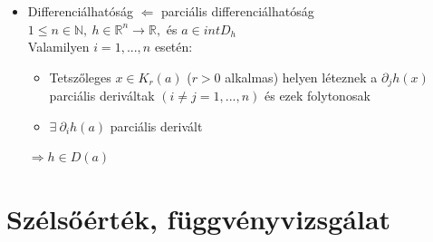 \documentclass[margin=0px]{article}
\newcommand{\R}{\mathbb{R}}
\begin{document}
\begin{description}
\begin{itemize}
						\item Differenciálhatóság $\Leftarrow$ parciális differenciálhatóság \\
							$ 1 \leq n \in \mathbb{N}, \ h \in \R^n \rightarrow \R, $ és $ a \in intD_h $ \\
							Valamilyen $i = 1,...,n$ esetén:
							\begin{itemize}
								\item Tetszőleges $ x \in K_r(a) $ ($r > 0$ alkalmas) helyen léteznek a $ \partial_jh(x)$ parciális deriváltak $ (i \neq j = 1,...,n)$ és ezek folytonosak
								\item $\exists \ \partial_ih(a)$ parciális derivált
							\end{itemize}
							$\Rightarrow h\in D(a)$
					\end{itemize}
			\end{description}
	\section{Szélsőérték, függvényvizsgálat}
\end{document}
